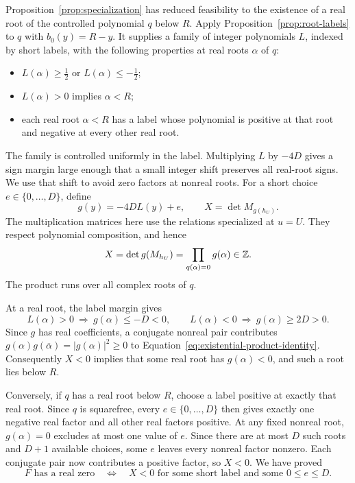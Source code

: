Proposition~\ref{prop:specialization} has reduced feasibility to the
existence of a real root of the controlled polynomial $q$ below $R$.
Apply Proposition~\ref{prop:root-labels} to $q$ with
$b_0(y)=R-y$.  It supplies a family of integer polynomials $L$, indexed
by short labels, with the following properties at real roots $\alpha$
of $q$:
\begin{itemize}
 \item $L(\alpha)\ge\tfrac12$ or $L(\alpha)\le-\tfrac12$;
 \item $L(\alpha)>0$ implies $\alpha<R$;
 \item each real root $\alpha<R$ has a label whose polynomial is
       positive at that root and negative at every other real root.
\end{itemize}
The family is controlled uniformly in the label.  Multiplying $L$ by
$-4D$ gives a sign margin large enough that a small integer shift
preserves all real-root signs.  We use that shift to avoid zero factors
at nonreal roots.  For a short choice $e\in\{0,\ldots,D\}$, define
\begin{equation}\label{eq:existential-sign-determinant}
 g(y)=-4DL(y)+e,
 \qquad X=\det M_{g(h_U)}.
\end{equation}
The multiplication matrices here use the relations specialized at
$u=U$.  They respect polynomial composition, and hence
\begin{equation}\label{eq:existential-product-identity}
 X=\det g(M_{h_U})
  =\prod_{q(\alpha)=0}g(\alpha)\in\mathbb Z.
\end{equation}
The product runs over all complex roots of $q$.

At a real root, the label margin gives
\[
 L(\alpha)>0\ \Longrightarrow\ g(\alpha)\le-D<0,
 \qquad
 L(\alpha)<0\ \Longrightarrow\ g(\alpha)\ge2D>0.
\]
Since $g$ has real coefficients, a conjugate nonreal pair contributes
$g(\alpha)g(\overline\alpha)=|g(\alpha)|^2\ge0$ to
Equation~\eqref{eq:existential-product-identity}.  Consequently $X<0$
implies that some real root has $g(\alpha)<0$, and such a root lies
below $R$.

Conversely, if $q$ has a real root below $R$, choose a label positive
at exactly that real root.  Since $q$ is squarefree, every
$e\in\{0,\ldots,D\}$ then gives
exactly one negative real factor and all other real factors positive.
At any fixed nonreal root, $g(\alpha)=0$ excludes at most one value of
$e$.  Since there are at most $D$ such roots and $D+1$ available
choices, some $e$ leaves every nonreal factor nonzero.  Each conjugate
pair now contributes a positive factor, so $X<0$.  We have proved
\begin{equation}\label{eq:existential-final-criterion}
 F\text{ has a real zero}
 \quad\Longleftrightarrow\quad
 X<0\text{ for some short label and some }0\le e\le D.
\end{equation}

